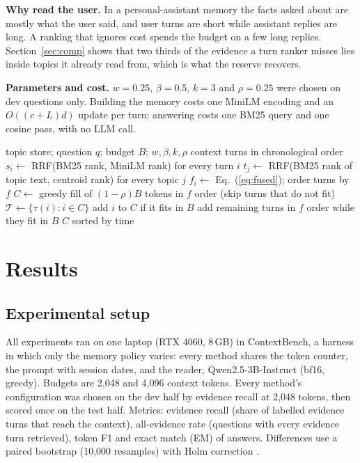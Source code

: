 \documentclass[conference]{IEEEtran}
\newcommand{\dcr}{$\Delta$Context-R}
\begin{document}
\textbf{Why read the user.} In a personal-assistant memory the facts asked about
are mostly what the user said, and user turns are short while assistant replies
are long. A ranking that ignores cost spends the budget on a few long replies.
Section~\ref{sec:comp} shows that two thirds of the evidence a turn ranker misses
lies inside topics it already read from, which is what the reserve recovers.

\textbf{Parameters and cost.} $w{=}0.25$, $\beta{=}0.5$, $k{=}3$ and
$\rho{=}0.25$ were chosen on dev questions only. Building the memory costs one
MiniLM encoding and an $O((c+L)d)$ update per turn; answering costs one BM25
query and one cosine pass, with no LLM call.

\begin{algorithm}[t]
\caption{\dcr{} retrieval (per question)}
\label{alg:ret}
\begin{algorithmic}[1]
\Require topic store; question $q$; budget $B$; $w,\beta,k,\rho$
\Ensure context turns in chronological order
\State $s_i\gets$ RRF(BM25 rank, MiniLM rank) for every turn $i$
\State $t_j\gets$ RRF(BM25 rank of topic text, centroid rank) for every topic $j$
\State $f_i\gets$ Eq.~(\ref{eq:fused}); order turns by $f$
\State $C\gets$ greedy fill of $(1-\rho)B$ tokens in $f$ order (skip turns that do not fit)
\State $\mathcal{T}\gets\{\tau(i): i\in C\}$ 
  \State add $i$ to $C$ if it fits in $B$
\EndFor
\State add remaining turns in $f$ order while they fit in $B$
\State \Return $C$ sorted by time
\end{algorithmic}
\end{algorithm}

\section{Results}
\label{sec:results}

\subsection{Experimental setup}
All experiments ran on one laptop (RTX 4060, 8\,GB) in ContextBench, a harness
in which only the memory policy varies: every method shares the token counter,
the prompt with session dates, and the reader, Qwen2.5-3B-Instruct
\cite{qwen2024qwen25} (bf16, greedy). Budgets are 2,048 and 4,096 context
tokens. Every method's configuration was chosen on the dev half by evidence
recall at 2,048 tokens, then scored once on the test half. Metrics: evidence
recall (share of labelled evidence turns that reach the context), all-evidence
rate (questions with every evidence turn retrieved), token F1 and exact match
(EM) of answers. Differences use a paired bootstrap (10,000 resamples) with Holm
correction \cite{holm1979simple}.
\end{document}
